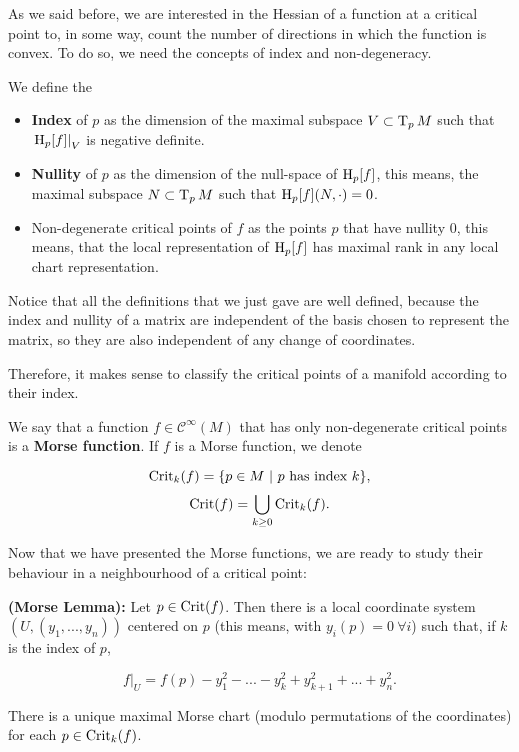 As we said before, we are interested in the Hessian of a function at a critical point to, in some way, count the number of directions in which the function is convex. To do so, we need the concepts of index and non-degeneracy.

\begin{deff}
	We define the

\begin{itemize}
	\item {\bf Index} of $p$ as the dimension of the maximal subspace $V \subset \operatorname T_pM$ such that $\left. \operatorname H_p[f] \right|_V$ is negative definite.
	\item {\bf Nullity} of $p$ as the dimension of the null-space of $\operatorname H_p[f]$, this means, the maximal subspace $N \subset \operatorname T_pM$ such that $\operatorname H_p[f](N,\cdot) = 0$.
	\item {Non-degenerate critical points} of $f$ as the points $p$ that have nullity $0$, this means, that the local representation of $\operatorname H_p[f]$ has maximal rank in any local chart representation.
\end{itemize}
\end{deff}

Notice that all the definitions that we just gave are well defined, because the index and nullity of a matrix are independent of the basis chosen to represent the matrix, so they are also independent of any change of coordinates.

Therefore, it makes sense to classify the critical points of a manifold according to their index.

\begin{deff}
	We say that a function $f \in \mathcal{C}^{\infty}(M)$ that has only non-degenerate critical points is a {\bf Morse function}.
	If $f$ is a Morse function, we denote

	\begin{displaymath}
		\text{Crit}_k(f) = \{p \in M \ | \text{ $p$ has index $k$}\} ,
	\end{displaymath}
	\begin{displaymath}
		\text{Crit}(f) = \bigcup_{k \geq 0} \text{Crit}_k(f) .
	\end{displaymath}
\end{deff}

Now that we have presented the Morse functions, we are ready to study their behaviour in a neighbourhood of a critical point:

\begin{prop}
	{\bf (Morse Lemma):} Let $p \in \text{Crit}(f)$. Then there is a local coordinate system $(U,(y_1,...,y_n))$ centered on $p$ (this means, with $y_i(p) = 0 \ \forall i$) such that, if $k$ is the index of $p$,

$$\left. f \right|_U = f(p) - y_1^2 - ... - y_k^2 + y_{k+1}^2 + ... + y_n^2 .$$
\end{prop}


\begin{coro}
	There is a unique maximal Morse chart (modulo permutations of the coordinates) for each $p \in \text{Crit}_k(f)$.
\end{coro}